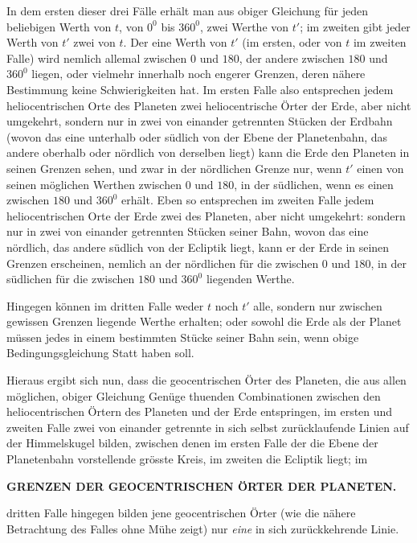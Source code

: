 In dem ersten dieser drei Fälle erhält man aus obiger Gleichung für jeden
beliebigen Werth von $t$, von $0^0$ bis $360^0$, zwei Werthe von $t'$; im zweiten gibt
jeder Werth von $t'$ zwei von $t$. Der eine Werth von $t'$ (im ersten, oder von $t$
im zweiten Falle) wird nemlich allemal zwischen $0$ und $180$, der andere zwischen
$180$ und $360^0$ liegen, oder vielmehr innerhalb noch engerer Grenzen, deren
nähere Bestimmung keine Schwierigkeiten hat. Im ersten Falle also entsprechen
jedem heliocentrischen Orte des Planeten zwei heliocentrische Örter
der Erde, aber nicht umgekehrt, sondern nur in zwei von einander getrennten
Stücken der Erdbahn (wovon das eine unterhalb oder südlich von der Ebene der
Planetenbahn, das andere oberhalb oder nördlich von derselben liegt) kann die
Erde den Planeten in seinen Grenzen sehen, und zwar in der nördlichen Grenze
nur, wenn $t'$ einen von seinen möglichen Werthen zwischen $0$ und $180$, in der
südlichen, wenn es einen zwischen $180$ und $360^0$ erhält. Eben so entsprechen
im zweiten Falle jedem heliocentrischen Orte der Erde zwei des Planeten, aber
nicht umgekehrt: sondern nur in zwei von einander getrennten Stücken seiner
Bahn, wovon das eine nördlich, das andere südlich von der Ecliptik liegt, kann
er der Erde in seinen Grenzen erscheinen, nemlich an der nördlichen für die zwischen
$0$ und $180$, in der südlichen für die zwischen $180$ und $360^0$ liegenden
Werthe.

Hingegen können im dritten Falle weder $t$ noch $t'$ alle, sondern nur zwischen
gewissen Grenzen liegende Werthe erhalten; oder sowohl die Erde als der
Planet müssen jedes in einem bestimmten Stücke seiner Bahn sein, wenn obige
Bedingungsgleichung Statt haben soll.

Hieraus ergibt sich nun, dass die geocentrischen Örter des Planeten, die
aus allen möglichen, obiger Gleichung Genüge thuenden Combinationen zwischen
den heliocentrischen Örtern des Planeten und der Erde entspringen, im ersten
und zweiten Falle zwei von einander getrennte in sich selbst zurücklaufende Linien
auf der Himmelskugel bilden, zwischen denen im ersten Falle der die Ebene
der Planetenbahn vorstellende grösste Kreis, im zweiten die Ecliptik liegt; im
\par\clearpage
\noindent{}%
\makebox[12mm][l]{}%
\parbox[t]{\dimexpr\linewidth-24mm\relax}{\centering\fontsize{7.4}{9.2}\selectfont\bfseries GRENZEN DER GEOCENTRISCHEN ÖRTER DER PLANETEN.\par}%
\par\nobreak\smallskip
\noindent dritten Falle hingegen bilden jene geocentrischen Örter (wie die nähere Betrachtung
des Falles ohne Mühe zeigt) nur \textit{eine} in sich zurückkehrende Linie.


